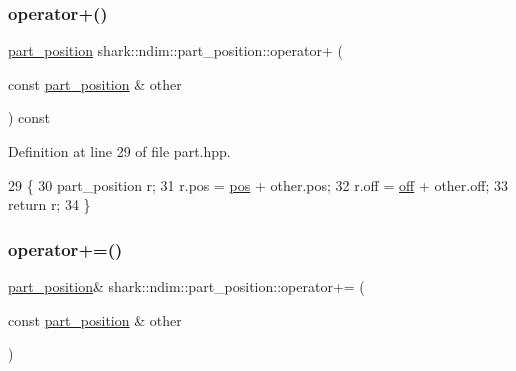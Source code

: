 \subsubsection{\texorpdfstring{operator+()}{operator+()}}
{\footnotesize\ttfamily \hyperlink{structshark_1_1ndim_1_1part__position}{part\+\_\+position} shark\+::ndim\+::part\+\_\+position\+::operator+ (\begin{DoxyParamCaption}\item[{const \hyperlink{structshark_1_1ndim_1_1part__position}{part\+\_\+position} \&}]{other }\end{DoxyParamCaption}) const\hspace{0.3cm}{\ttfamily [inline]}}



Definition at line 29 of file part.\+hpp.


\begin{DoxyCode}
29                                                                                   \{
30                             part\_position r;
31                             r.pos = \hyperlink{structshark_1_1ndim_1_1part__position_abbc439e94001c9f96cc8985d683e24e0}{pos} + other.pos;
32                             r.off = \hyperlink{structshark_1_1ndim_1_1part__position_a914e3d4214109e716fcfd06a46e07810}{off} + other.off;
33                             \textcolor{keywordflow}{return} r;
34                         \}
\end{DoxyCode}
\hypertarget{structshark_1_1ndim_1_1part__position_a98032711a8d472c30613f93e70b0b269}{}\label{structshark_1_1ndim_1_1part__position_a98032711a8d472c30613f93e70b0b269} 
\subsubsection{\texorpdfstring{operator+=()}{operator+=()}}
{\footnotesize\ttfamily \hyperlink{structshark_1_1ndim_1_1part__position}{part\+\_\+position}\& shark\+::ndim\+::part\+\_\+position\+::operator+= (\begin{DoxyParamCaption}\item[{const \hyperlink{structshark_1_1ndim_1_1part__position}{part\+\_\+position} \&}]{other }\end{DoxyParamCaption})\hspace{0.3cm}{\ttfamily [inline]}}



